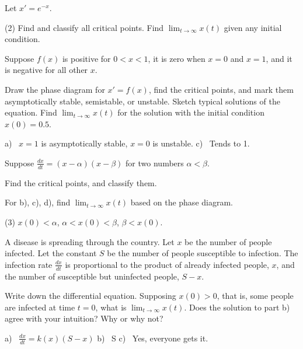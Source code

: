 \begin{exercise}\ansMark%
Let $x'=e^{-x}$.
\begin{tasks}(2)
\task Find and classify all critical points.
\task Find $\displaystyle \lim_{t\to\infty} x(t)$ given any 
initial condition.
\end{tasks}
\end{exercise}


\begin{exercise}
Suppose $f(x)$ is positive for $0 < x < 1$, it is zero when $x=0$ and $x=1$,
and it is negative for all other $x$.
\begin{tasks}
\task Draw the phase diagram for $x' = f(x)$,
find the critical points, and mark them asymptotically stable, semistable, or unstable.
\task Sketch typical solutions of the equation.
\task Find $\displaystyle \lim_{t\to \infty} x(t)$ for the solution with the initial condition
$x(0) = 0.5$.
\end{tasks}
\end{exercise}
\comboSol{%
}
{%
a)~ $x=1$ is asymptotically stable, $x=0$ is unstable. \quad c)~ Tends to 1.
}

\begin{exercise}\ansMark%
Suppose $\frac{dx}{dt} = (x-\alpha)(x-\beta)$ for two numbers $\alpha <
\beta$.
\begin{tasks}
\task Find the critical points, and classify them.
\end{tasks}
For b), c), d), find $\displaystyle \lim_{t\to\infty} x(t)$ based on
the phase diagram.
\begin{tasks}[resume](3)
\task $x(0) < \alpha$,
\task $\alpha < x(0) < \beta$,
\task $\beta < x(0)$.
\end{tasks}
\end{exercise}

\begin{exercise}
A disease is spreading through the country.  Let $x$ be the number of people
infected.  Let the constant $S$ be the number of people susceptible to
infection.  The infection rate $\frac{dx}{dt}$ is proportional to the product
of already infected people, $x$, and the number of susceptible but
uninfected people, $S-x$.
\begin{tasks}
\task Write down the differential equation.
\task Supposing $x(0) > 0$, that is, some people are infected at time $t=0$,
what is
$\displaystyle \lim_{t\to\infty} x(t)$.
\task Does the solution to part b) agree with your intuition?  Why or why not?
\end{tasks}
\end{exercise}
\comboSol{%
}
{%
a)~ $\frac{dx}{dt} = k(x)(S - x)$ \quad b)~ S \qquad c)~ Yes, everyone gets it.
}


\setcounter{exercise}{100}
